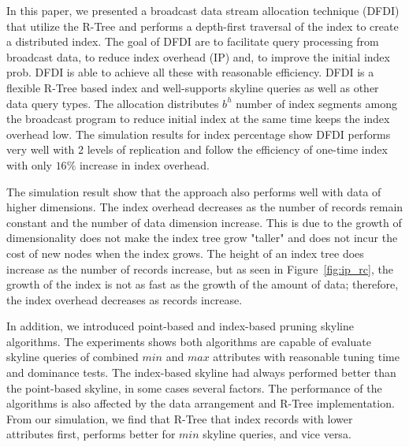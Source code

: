In this paper, we presented a broadcast data stream allocation technique
(DFDI) that utilize the R-Tree and performs a depth-first traversal of the
index to create a distributed index. The goal of DFDI are to facilitate
query processing from broadcast data, to reduce index overhead (IP) and,
to improve the initial index prob. DFDI is able to achieve all these with
reasonable efficiency. DFDI is a flexible R-Tree based index and
well-supports skyline queries as well as other data query types. The allocation
distributes $b^h$ number of index segments among the broadcast program to
reduce initial index at the same time keeps the index overhead low. The simulation
results for index percentage show DFDI performs very well with 2 levels of
replication and follow the efficiency of one-time index with only $16\%$
increase in index overhead.

The simulation result show that the approach also performs well with data
of higher dimensions. The index overhead decreases as the number of records
remain constant and the number of data dimension increase. This is due to
the growth of dimensionality does not make the index tree grow "taller" and
does not incur the cost of new nodes when the index grows. The height of
an index tree does increase as the number of records increase, but as seen
in Figure~\ref{fig:ip_rc}, the growth of the index is not as fast as the
growth of the amount of data; therefore, the index overhead decreases as
records increase.

In addition, we introduced point-based and index-based pruning skyline
algorithms. The experiments shows both algorithms are capable of evaluate
skyline queries of combined $min$ and $max$ attributes with reasonable
tuning time and dominance tests. The index-based skyline had
always performed better than the point-based skyline, in some cases several
factors. The performance of the algorithms is also affected by the data
arrangement and R-Tree implementation. From our simulation, we find that
R-Tree that index records with lower attributes first, performs better for
$min$ skyline queries, and vice versa.